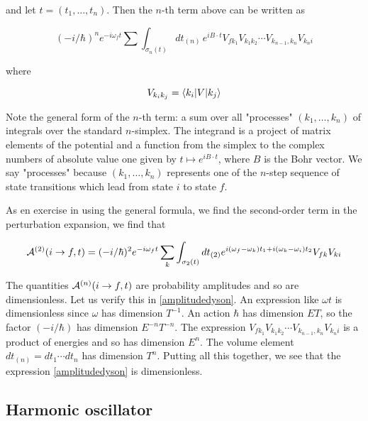 and let $t = (t_1, \ldots, t_n)$. Then the $n$-th term above can be written as

\begin{equation}
\label{amplitudedyson}
 (-i/\hbar)^n e^{-i\omega_ft} \sum \int_{\sigma_n(t)} dt_{(n)}\,
e^{iB\cdot t} V_{fk_1}V_{k_1k_2} \cdots V_{k_{n-1},k_n} V_{k_ni }
\end{equation}

where

\begin{equation}
V_{k_ik_j} = \langle k_i | V | k_j \rangle
\end{equation}

Note the general form of the $n$-th term: a sum over all "processes" $(k_1, \ldots , k_n)$ of integrals over the standard $n$-simplex.  The integrand is a project of matrix elements of the potential and a function from the simplex to the complex numbers of absolute value one given by $t \mapsto e^{iB\cdot t}$, where $B$ is the Bohr vector.  We say "processes" because $(k_1, \ldots , k_n)$ represents one of the $n$-step sequence of state transitions which lead from state $i$ to state $f$.

As en exercise in using the general formula, we find the second-order term in the perturbation expansion, we find that

\begin{equation}
\mathcal{A}^{(2)}(i \to f, t) = (-i/\hbar)^2 e^{-i\omega_f t}\sum_k\int_{\sigma_2(t)} dt_{(2)}
e^{  i(\omega_f - \omega_k) t_1 + i( \omega_k - \omega_i )t_2  }  V_{fk}V_{ki}
\end{equation}

\begin{remark}
The quantities $\mathcal{A}^{(n)}(i \to f, t)$ are probability amplitudes and so are dimensionless.  Let us verify this in \eqref{amplitudedyson}.  An expression like $\omega t$ is dimensionless since $\omega$ has dimension $T^{-1}$.  An action $\hbar$ has dimension $ET$, so the factor $(-i/\hbar)$ has dimension $E^{-n}T^{-n}$.  The expression $ V_{fk_1}V_{k_1k_2} \cdots V_{k_{n-1},k_n} V_{k_ni } $ is a product of energies and so has dimension $E^n$.  The volume element $dt_{(n)} = dt_1\cdots dt_n$ has dimension $T^n$.  Putting all this together, we see that the expression \eqref{amplitudedyson} is dimensionless.
\end{remark}

\subsection{Harmonic oscillator}

